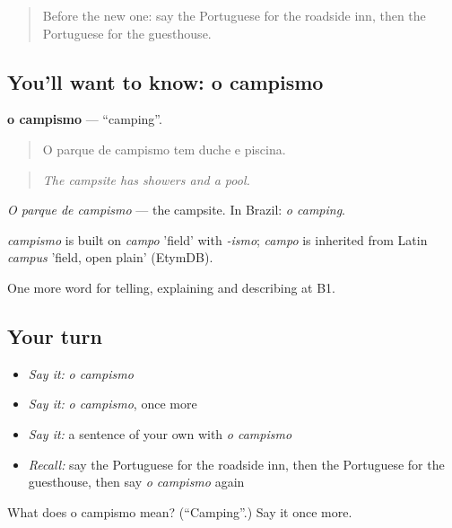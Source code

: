 \label{lesson:PT-C425-campismo}



\begin{quote}
Before the new one: say the Portuguese for the roadside inn, then the Portuguese for the guesthouse.
\end{quote}

\subsection*{You'll want to know: o campismo}
\textbf{o campismo} — \textquotedblleft{}camping\textquotedblright{}.

\begin{quote}
O parque de campismo tem duche e piscina.
\end{quote}

\begin{quote}
\emph{The campsite has showers and a pool.}
\end{quote}

\emph{O parque de campismo} — the campsite. In Brazil: \emph{o camping}.

\begin{cousinweb}
\emph{campismo} is built on \emph{campo} 'field' with \emph{-ismo}; \emph{campo} is inherited from Latin \emph{campus} 'field, open plain' (EtymDB).
\end{cousinweb}

\begin{grammarlens}[title={What you've built}]
One more word for telling, explaining and describing at B1.
\end{grammarlens}

\subsection*{Your turn}
\begin{itemize}
\raggedright
  \item \emph{Say it:} \emph{o campismo}
  \item \emph{Say it:} \emph{o campismo}, once more
  \item \emph{Say it:} a sentence of your own with \emph{o campismo}
  \item \emph{Recall:} say the Portuguese for the roadside inn, then the Portuguese for the guesthouse, then say \emph{o campismo} again
\end{itemize}

\begin{tcolorbox}[breakable,colback=teal!4,colframe=teal!35!black,title={Before you move on}]
What does o campismo mean? (\textquotedblleft{}Camping\textquotedblright{}.) Say it once more.
\end{tcolorbox}
